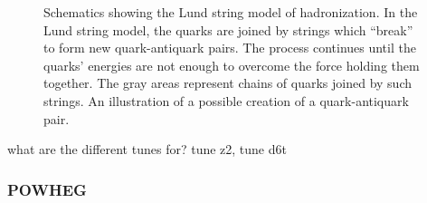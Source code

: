  \begin{figure}[htb]
  \begin{center}
  \end{center}
  \caption[Schematics showing the Lund string model of hadronization]
	  {Schematics showing the Lund string model of hadronization.
	   In the Lund string model, the quarks 
	  are joined by strings which ``break'' to form new 
	  quark-antiquark pairs. 
	  The process continues until the quarks' energies are  
	  not enough to overcome the force holding them together.  
	  The gray areas represent chains of quarks joined by such strings.  
	   An illustration of a possible 
	  creation of a quark-antiquark pair.  
	  }
  \label{fig:MClund}
 \end{figure}



what are the different tunes for?  tune z2, tune d6t

\subsubsection{POWHEG}
\label{sim:MCGensPowheg}

